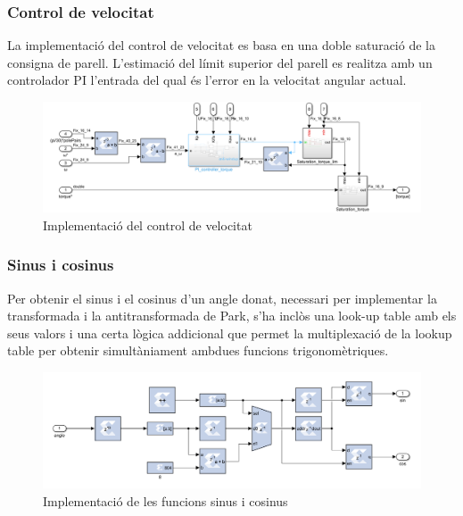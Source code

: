 {    \subsubsection{ Control de velocitat }
    { 
        La implementació del control de velocitat es basa en una doble
        saturació de la consigna de parell. L'estimació del límit superior del
        parell es realitza amb un controlador PI l'entrada del qual és l'error
        en la velocitat angular actual.

        \begin{figure}[!htb]
            \centering
            \captionsetup{justification=centering, margin=1.5cm}
            \includegraphics[width=14cm]
                { img/4_implementacio/speed_control.png }
            \caption{ Implementació del control de velocitat }
        \end{figure}
    }

    \subsubsection{ Sinus i cosinus }
    { 
        Per obtenir el sinus i el cosinus d'un angle donat, necessari per
        implementar la transformada i la antitransformada de Park, s'ha
        inclòs una look-up table amb els seus valors i una certa lògica
        addicional que permet la multiplexació de la lookup table per obtenir
        simultàniament ambdues funcions trigonomètriques.

        \begin{figure}[!htb]
            \centering
            \captionsetup{justification=centering, margin=1.5cm}
            \includegraphics[width=12cm]
                { img/4_implementacio/sineLUT.png }
            \caption{ Implementació de les funcions sinus i cosinus }
        \end{figure}
    }

}
